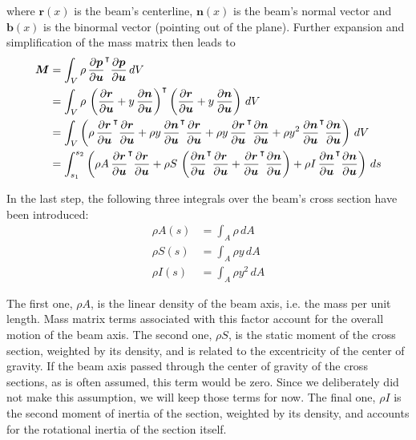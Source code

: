 where $\boldsymbol{r}(x)$ is the beam's centerline, $\boldsymbol{n}(x)$ is the beam's normal vector and $\boldsymbol{b}(x)$ is the binormal vector (pointing out of the plane).
Further expansion and simplification of the mass matrix then leads to
%
\begin{align}
\boldsymbol{M} &= \int_{V} \rho\,\frac{\partial\boldsymbol{p}}{\partial\boldsymbol{u}}^\intercal\frac{\partial\boldsymbol{p}}{\partial\boldsymbol{u}}\,dV \notag \\
&= \int_{V} \rho\,\left(\frac{\partial\boldsymbol{r}}{\partial\boldsymbol{u}} + y\,\frac{\partial\boldsymbol{n}}{\partial\boldsymbol{u}}\right)^\intercal\left(\frac{\partial\boldsymbol{r}}{\partial\boldsymbol{u}} + y\,\frac{\partial\boldsymbol{n}}{\partial\boldsymbol{u}}\right)\,dV \notag \\
&= \int_{V} \left(\rho\,\frac{\partial\boldsymbol{r}}{\partial\boldsymbol{u}}^\intercal\frac{\partial\boldsymbol{r}}{\partial\boldsymbol{u}} + \rho y\,\frac{\partial\boldsymbol{n}}{\partial\boldsymbol{u}}^\intercal\frac{\partial\boldsymbol{r}}{\partial\boldsymbol{u}} + \rho y\,\frac{\partial\boldsymbol{r}}{\partial\boldsymbol{u}}^\intercal\frac{\partial\boldsymbol{n}}{\partial\boldsymbol{u}} + \rho y^2\,\frac{\partial\boldsymbol{n}}{\partial\boldsymbol{u}}^\intercal\frac{\partial\boldsymbol{n}}{\partial\boldsymbol{u}}\right)\,dV \notag \\
&= \int_{s_1}^{s_2} \left(\rho A\,\frac{\partial\boldsymbol{r}}{\partial\boldsymbol{u}}^\intercal\frac{\partial\boldsymbol{r}}{\partial\boldsymbol{u}} + \rho S\,\left(\frac{\partial\boldsymbol{n}}{\partial\boldsymbol{u}}^\intercal\frac{\partial\boldsymbol{r}}{\partial\boldsymbol{u}} + \frac{\partial\boldsymbol{r}}{\partial\boldsymbol{u}}^\intercal\frac{\partial\boldsymbol{n}}{\partial\boldsymbol{u}}\right) + \rho I\,\frac{\partial\boldsymbol{n}}{\partial\boldsymbol{u}}^\intercal\frac{\partial\boldsymbol{n}}{\partial\boldsymbol{u}}\right)\,ds
\end{align}

In the last step, the following three integrals over the beam's cross section have been introduced:
%
\begin{align}
\rho A(s) &= \int_A \rho\,dA \\
\rho S(s) &= \int_A \rho y\,dA \\
\rho I(s) &= \int_A \rho y^2\,dA
\end{align}

The first one, $\rho A$, is the linear density of the beam axis, i.e. the mass per unit length.
Mass matrix terms associated with this factor account for the overall motion of the beam axis.
The second one, $\rho S$, is the static moment of the cross section, weighted by its density, and is related to the excentricity of the center of gravity.
If the beam axis passed through the center of gravity of the cross sections, as is often assumed, this term would be zero.
Since we deliberately did not make this assumption, we will keep those terms for now.
The final one, $\rho I$ is the second moment of inertia of the section, weighted by its density, and accounts for the rotational inertia of the section itself.

